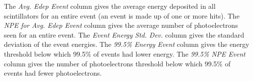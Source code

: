 \documentclass[10pt]{article}
\begin{document}
The \textit{Avg. Edep Event} column gives the average energy deposited in all scintillators for an entire event (an event is made up of one or more hits). The \textit{NPE for Avg. Edep Event} column gives the average number of photoelectrons seen for an entire event. The \textit{Event Energy Std. Dev.} column gives the standard deviation of the event energies. The \textit{99.5\% Energy Event} column gives the energy threshold below which 99.5\% of events had lower energy. The \textit{99.5\% NPE Event} column gives the number of photoelectrons threshold below which 99.5\% of events had fewer photoelectrons.\\

\end{document}

